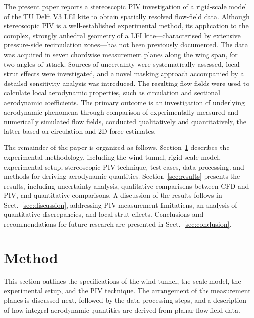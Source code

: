 \documentclass[wes, manuscript]{copernicus}
\begin{document}
The present paper reports a stereoscopic PIV investigation of a rigid-scale model of the TU Delft V3 LEI kite to obtain spatially resolved flow-field data. Although stereoscopic PIV is a well-established experimental method, its application to the complex, strongly anhedral geometry of a LEI kite—characterised by extensive pressure-side recirculation zones—has not been previously documented.
The data was acquired in seven chordwise measurement planes along the wing span, for two angles of attack. Sources of uncertainty were systematically assessed, local strut effects were investigated, and a novel masking approach accompanied by a detailed sensitivity analysis was introduced. The resulting flow fields were used to calculate local aerodynamic properties, such as circulation and sectional aerodynamic coefficients. The primary outcome is an investigation of underlying aerodynamic phenomena through comparison of experimentally measured and numerically simulated flow fields, conducted qualitatively and quantitatively, the latter based on circulation and 2D force estimates.

The remainder of the paper is organized as follows. Section~\ref{sec:method} describes the experimental methodology, including the wind tunnel, rigid scale model, experimental setup, stereoscopic PIV technique, test cases, data processing, and methods for deriving aerodynamic quantities. Section~\ref{sec:results} presents the results, including uncertainty analysis, qualitative comparisons between CFD and PIV, and quantitative comparisons. A discussion of the results follows in Sect.~\ref{sec:discussion}, addressing PIV measurement limitations, an analysis of quantitative discrepancies, and local strut effects. Conclusions and recommendations for future research are presented in Sect.~\ref{sec:conclusion}.

%
\section{Method}\label{sec:method}
%
This section outlines the specifications of the wind tunnel, the scale model, the experimental setup, and the PIV technique. The arrangement of the measurement planes is discussed next, followed by the data processing steps, and a description of how integral aerodynamic quantities are derived from planar flow field data.
%
\end{document}
